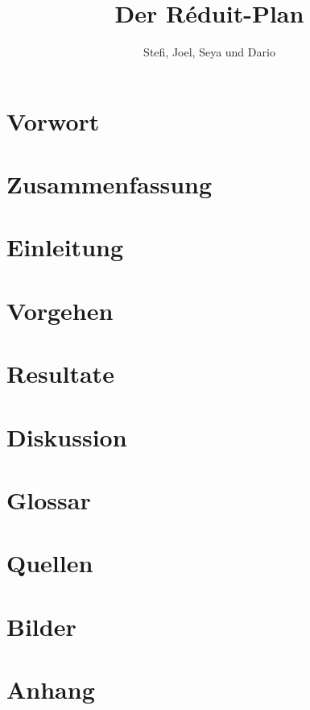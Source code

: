 \documentclass[opensans, a4paper]{article}
\title{Der Réduit-Plan}
\author{Stefi, Joel, Seya und Dario}
\begin{document}


\tableofcontents

\newpage

\section{Vorwort} \label{Vorwort}

\newpage 

\section{Zusammenfassung} \label{Zusammenfassung}

\newpage

\section{Einleitung} \label{Einleitung}

\newpage

\section{Vorgehen} \label{Vorgehen}

\newpage

\section{Resultate} \label{Resultate}

\newpage

\section{Diskussion} \label{Diskussion}

\newpage

\section{Glossar} \label{Glossar}
\printglossaries
\newpage

\section{Quellen} \label{Quellen}
{ 
\printbibliography
}
\newpage

\section{Bilder} \label{Bilder}
\listoffigures
\newpage

\section{Anhang} \label{Anhang}

\end{document}
